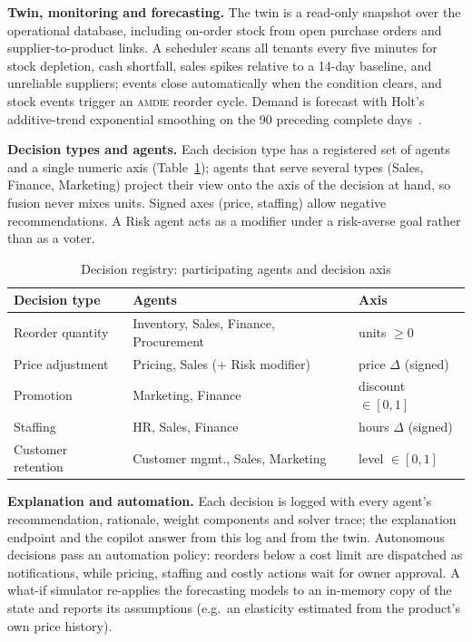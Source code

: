 \documentclass[conference]{IEEEtran}
\newcommand{\amdie}{\textsc{amdie}}
\begin{document}
\textbf{Twin, monitoring and forecasting.} The twin is a read-only snapshot over the operational database, including on-order stock from open purchase orders and supplier-to-product links. A scheduler scans all tenants every five minutes for stock depletion, cash shortfall, sales spikes relative to a 14-day baseline, and unreliable suppliers; events close automatically when the condition clears, and stock events trigger an \amdie{} reorder cycle. Demand is forecast with Holt's additive-trend exponential smoothing on the 90 preceding complete days~\cite{hyndman2021}.

\textbf{Decision types and agents.} Each decision type has a registered set of agents and a single numeric axis (Table~\ref{tab:registry}); agents that serve several types (Sales, Finance, Marketing) project their view onto the axis of the decision at hand, so fusion never mixes units. Signed axes (price, staffing) allow negative recommendations. A Risk agent acts as a modifier under a risk-averse goal rather than as a voter.

\begin{table}[t]
\centering\scriptsize
\caption{Decision registry: participating agents and decision axis}
\label{tab:registry}
\setlength{\tabcolsep}{3pt}
\begin{tabular}{@{}lll@{}}
\toprule
Decision type & Agents & Axis \\
\midrule
Reorder quantity & Inventory, Sales, Finance, Procurement & units $\geq 0$ \\
Price adjustment & Pricing, Sales (+ Risk modifier) & price $\Delta$ (signed) \\
Promotion & Marketing, Finance & discount $\in[0,1]$ \\
Staffing & HR, Sales, Finance & hours $\Delta$ (signed) \\
Customer retention & Customer mgmt., Sales, Marketing & level $\in[0,1]$ \\
\bottomrule
\end{tabular}
\end{table}

\textbf{Explanation and automation.} Each decision is logged with every agent's recommendation, rationale, weight components and solver trace; the explanation endpoint and the copilot answer from this log and from the twin. Autonomous decisions pass an automation policy: reorders below a cost limit are dispatched as notifications, while pricing, staffing and costly actions wait for owner approval. A what-if simulator re-applies the forecasting models to an in-memory copy of the state and reports its assumptions (e.g.\ an elasticity estimated from the product's own price history).
\end{document}
